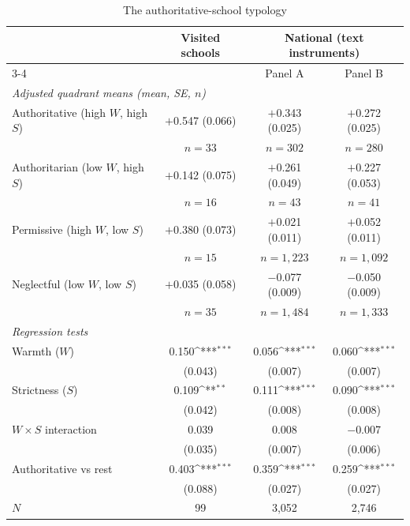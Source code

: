 \begin{table}[htbp]\centering
\caption{The authoritative-school typology}
\label{tab:typology}
\def\sym#1{\ifmmode^{#1}\else\(^{#1}\)\fi}
\small
\footnotesize\setlength{\tabcolsep}{4pt}
\begin{tabular}{lccc}
\toprule
 & Visited schools & \multicolumn{2}{c}{National (text instruments)} \\
\cmidrule(lr){3-4}
 & & Panel A & Panel B \\
\midrule
\multicolumn{4}{l}{\textit{Adjusted quadrant means (mean, SE, $n$)}} \\
\addlinespace[2pt]
Authoritative (high $W$, high $S$) & $+$0.547 (0.066) & $+$0.343 (0.025) & $+$0.272 (0.025) \\
 & $n=33$ & $n=302$ & $n=280$ \\
Authoritarian (low $W$, high $S$) & $+$0.142 (0.075) & $+$0.261 (0.049) & $+$0.227 (0.053) \\
 & $n=16$ & $n=43$ & $n=41$ \\
Permissive (high $W$, low $S$) & $+$0.380 (0.073) & $+$0.021 (0.011) & $+$0.052 (0.011) \\
 & $n=15$ & $n=1{,}223$ & $n=1{,}092$ \\
Neglectful (low $W$, low $S$) & $+$0.035 (0.058) & $-$0.077 (0.009) & $-$0.050 (0.009) \\
 & $n=35$ & $n=1{,}484$ & $n=1{,}333$ \\
\midrule
\multicolumn{4}{l}{\textit{Regression tests}} \\
\addlinespace[2pt]
Warmth ($W$) & 0.150\sym{***} & 0.056\sym{***} & 0.060\sym{***} \\
 & (0.043) & (0.007) & (0.007) \\
Strictness ($S$) & 0.109\sym{**} & 0.111\sym{***} & 0.090\sym{***} \\
 & (0.042) & (0.008) & (0.008) \\
$W \times S$ interaction & 0.039 & 0.008 & $-$0.007 \\
 & (0.035) & (0.007) & (0.006) \\
Authoritative vs rest & 0.403\sym{***} & 0.359\sym{***} & 0.259\sym{***} \\
 & (0.088) & (0.027) & (0.027) \\
\midrule
$N$ & 99 & 3{,}052 & 2{,}746 \\
\bottomrule
\end{tabular}
\begin{minipage}{\linewidth}
\smallskip

\end{minipage}
\end{table}
